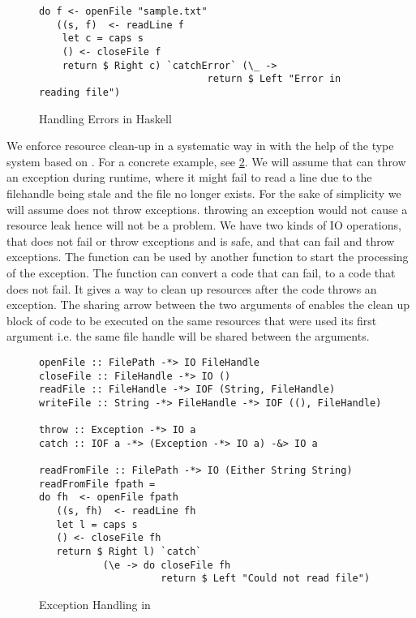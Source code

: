 \begin{figure}[h]
  \begin{framed}
\begin{verbatim}
do f <- openFile "sample.txt"
   ((s, f)  <- readLine f
    let c = caps s
    () <- closeFile f
    return $ Right c) `catchError` (\_ ->
                             return $ Left "Error in reading file")
\end{verbatim}
  \end{framed}
  \caption{Handling Errors in Haskell}
  \label{fig:haskell-error-handling}
\end{figure}

We enforce resource clean-up in a systematic way in \qub{} with the help of the type system based on \BI{}.
For a concrete example, see \cref{fig:qub-file-exceptions}.
We will assume that  can throw an exception during runtime, where
it might fail to read a line due to the filehandle being stale and the file no longer exists.
For the sake of simplicity we will assume 
does not throw exceptions.  throwing an exception would not cause a resource leak hence will not be a problem.
We have two kinds of IO operations,  that does not fail or throw exceptions and is safe,
and  that can fail and throw exceptions. The function  can be used by another function to start
the processing of the exception. The function  can convert a code that can fail, to a code
that does not fail. It gives a way to clean up resources after the code throws an exception.
The sharing arrow between the two arguments of  enables the clean up block of code to be executed on the same resources
that were used its first argument i.e. the same file handle will be shared between the arguments.

\begin{figure}[h]
  \begin{framed}
    \begin{verbatim}
openFile :: FilePath -*> IO FileHandle
closeFile :: FileHandle -*> IO ()
readFile :: FileHandle -*> IOF (String, FileHandle)
writeFile :: String -*> FileHandle -*> IOF ((), FileHandle)

throw :: Exception -*> IO a
catch :: IOF a -*> (Exception -*> IO a) -&> IO a

readFromFile :: FilePath -*> IO (Either String String)
readFromFile fpath =
do fh  <- openFile fpath
   ((s, fh)  <- readLine fh
   let l = caps s
   () <- closeFile fh
   return $ Right l) `catch`
           (\e -> do closeFile fh
                     return $ Left "Could not read file")
    \end{verbatim}
  \end{framed}
  \caption{Exception Handling in \qub{}}
  \label{fig:qub-file-exceptions}
\end{figure}


